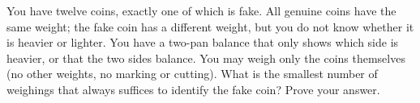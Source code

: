 You have twelve coins, exactly one of which is fake. All genuine coins have the same weight; the fake coin has a different weight, but you do not know whether it is heavier or lighter. You have a two-pan balance that only shows which side is heavier, or that the two sides balance. You may weigh only the coins themselves (no other weights, no marking or cutting). What is the smallest number of weighings that always suffices to identify the fake coin? Prove your answer.
